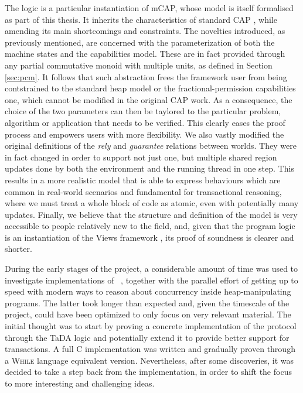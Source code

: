 The logic is a particular instantiation of mCAP, whose model is itself formalised as part of this thesis. It inherits the characteristics of standard CAP \cite{cap}, while amending its main shortcomings and constraints. The novelties introduced, as previously mentioned, are concerned with the parameterization of both the machine states and the capabilities model. These are in fact provided through any partial commutative monoid with multiple units, as defined in Section \ref{sec:pcm}. It follows that such abstraction frees the framework user from being contstrained to the standard heap model or the fractional-permission capabilities \cite{fractional} one, which cannot be modified in the original CAP work. As a consequence, the choice of the two parameters can then be taylored to the particular problem, algorithm or application that needs to be verified. This clearly eases the proof process and empowers users with more flexibility. We also vastly modified the original definitions of the \textit{rely} and \textit{guarantee} relations between worlds. They were in fact changed in order to support not just one, but multiple shared region updates done by both the environment and the running thread in one step. This results in a more realistic model that is able to express behaviours which are common in real-world scenarios and fundamental for transactional reasoning, where we must treat a whole block of code as atomic, even with potentially many updates. Finally, we believe that the structure and definition of the model is very accessible to people relatively new to the field, and, given that the program logic is an instantiation of the Views framework \cite{views}, its proof of soundness is clearer and shorter.

	During the early stages of the project, a considerable amount of time was used to investigate implementations of \tpl\ \cite{implementation2pl}, together with the parallel effort of getting up to speed with modern ways to reason about concurrency inside heap-manipulating programs. The latter took longer than expected and, given the timescale of the project, could have been optimized to only focus on very relevant material. The initial thought was to start by proving a concrete implementation of the protocol through the TaDA logic \cite{tada} and potentially extend it to provide better support for transactions. A full C implementation was written and gradually proven through a \textsc{While} language equivalent version. Nevertheless, after some discoveries, it was decided to take a step back from the implementation, in order to shift the focus to more interesting and challenging ideas.

